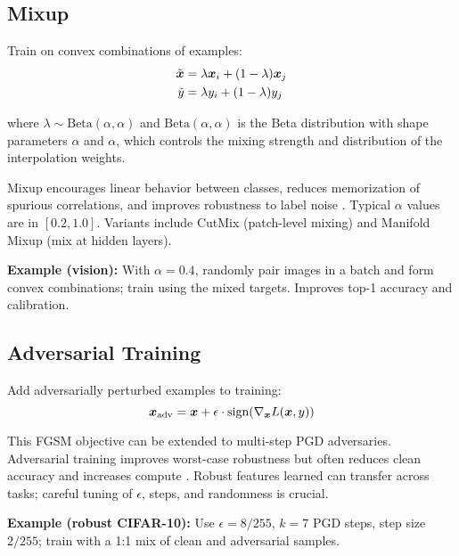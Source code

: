 \subsection{Mixup}

Train on convex combinations of examples:
\begin{align}
\tilde{\boldsymbol{x}} &= \lambda \boldsymbol{x}_i + (1-\lambda) \boldsymbol{x}_j \\
\tilde{y} &= \lambda y_i + (1-\lambda) y_j
\end{align}

where $\lambda \sim \text{Beta}(\alpha, \alpha)$ and $\text{Beta}(\alpha, \alpha)$ is the Beta distribution with shape parameters $\alpha$ and $\alpha$, which controls the mixing strength and distribution of the interpolation weights.

Mixup encourages linear behavior between classes, reduces memorization of spurious correlations, and improves robustness to label noise \cite{Zhang2018Mixup}. Typical $\alpha$ values are in $[0.2, 1.0]$. Variants include CutMix (patch-level mixing) \cite{Yun2019CutMix} and Manifold Mixup (mix at hidden layers).

\begin{example}
\textbf{Example (vision):} With $\alpha=0.4$, randomly pair images in a batch and form convex combinations; train using the mixed targets. Improves top-1 accuracy and calibration.
\end{example}

\subsection{Adversarial Training}

Add adversarially perturbed examples to training:
\begin{equation}
\boldsymbol{x}_{\text{adv}} = \boldsymbol{x} + \epsilon \cdot \text{sign}(\nabla_{\boldsymbol{x}} L(\boldsymbol{x}, y))
\end{equation}

This FGSM objective can be extended to multi-step PGD adversaries. Adversarial training improves worst-case robustness but often reduces clean accuracy and increases compute \cite{Goodfellow2014}. Robust features learned can transfer across tasks; careful tuning of $\epsilon$, steps, and randomness is crucial.

\begin{example}
\textbf{Example (robust CIFAR-10):} Use $\epsilon=8/255$, $k=7$ PGD steps, step size $2/255$; train with a 1:1 mix of clean and adversarial samples.
\end{example}

